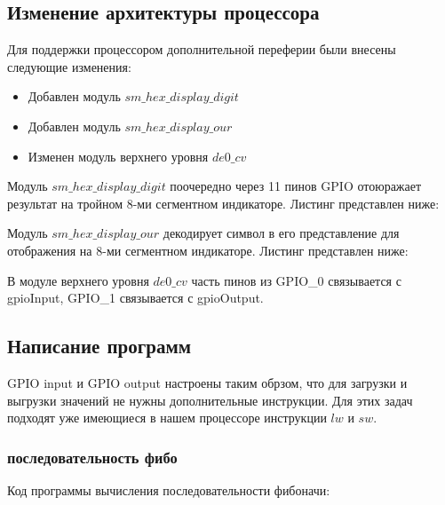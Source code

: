 \documentclass[a4paper,14pt]{article}
\begin{document}
	\subsection{Изменение архитектуры процессора}
	
	Для поддержки процессором дополнительной переферии были внесены следующие изменения:
	
	\begin{itemize}
		
		\item Добавлен модуль $sm\_hex\_display\_digit$

		\item Добавлен модуль $sm\_hex\_display\_our$
		
		\item Изменен модуль верхнего уровня $de0\_cv$	
			
	\end{itemize}
		
		Модуль $sm\_hex\_display\_digit$ поочередно через 11 пинов GPIO отоюражает результат на тройном 8-ми сегментном индикаторе.
		Листинг представлен ниже: 
		
		{\small {}}
		
		Модуль $sm\_hex\_display\_our$ декодирует символ в его представление для отображения на 8-ми сегментном индикаторе.
		Листинг представлен ниже:
		
		{\small {}}
		
		В модуле верхнего уровня $de0\_cv$ часть пинов из GPIO\_0 связывается с gpioInput, GPIO\_1 связывается с gpioOutput.
			
		{\small {}}
	
	\subsection{Написание программ}
	
		GPIO input и GPIO output настроены таким обрзом, что для загрузки и выгрузки значений не нужны дополнительные инструкции.
		Для этих задач подходят уже имеющиеся в нашем процессоре инструкции $lw$ и $sw$.
		
	\subsubsection{последовательность фибо}
		
		Код программы вычисления последовательности фибоначи:
		
\end{document}
